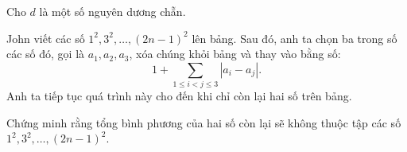 \ifshowproblem
\begin{problem}\label{example:BMO-2015-P1}
    Cho \( d \) là một số nguyên dương chẵn.

    John viết các số \( 1^2, 3^2, \ldots, (2n - 1)^2 \) lên bảng.  
    Sau đó, anh ta chọn ba trong số các số đó, gọi là \( a_1, a_2, a_3 \),  
    xóa chúng khỏi bảng và thay vào bằng số:
    \[
        1 + \sum_{1 \le i < j \le 3} |a_i - a_j|.
    \]
    Anh ta tiếp tục quá trình này cho đến khi chỉ còn lại hai số trên bảng.

    Chứng minh rằng tổng bình phương của hai số còn lại sẽ không thuộc tập các số  
    \( 1^2, 3^2, \ldots, (2n - 1)^2 \).
\end{problem}
\fi

\footnotemark
{}
\fi